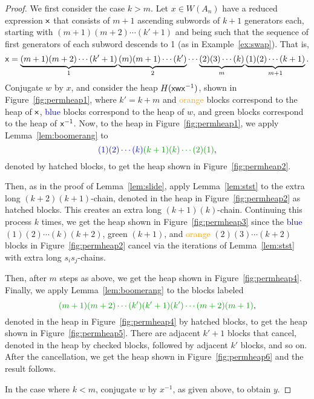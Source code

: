 \begin{proof} We first consider the case $k>m$.
    Let $x \in W(A_n)$ have a reduced expression $\mathsf{x}$ that consists of $m+1$ ascending subwords of $k+1$ generators each, starting with $(m+1)(m+2) \cdots (k'+1)$ and being such that the sequence of first generators of each subword descends to 1 (as in Example~\ref{ex:swap}).
    That is, $$\mathsf{x} = \underbrace{(m+1)(m+2) \cdots (k'+1)}_{1} \underbrace{(m)(m+1) \cdots (k')}_{2} \cdots \underbrace{(2)(3) \cdots (k)}_{m} \underbrace{(1)(2) \cdots (k+1)}_{m+1}.$$
    Conjugate $w$ by $x$, and consider the heap $H({\mathsf{x}}{\mathsf{w}}{\mathsf{x}^{-1}})$, shown in Figure~\ref{fig:permheap1}, where $k'=k+m$ and \textcolor{orange}{orange} blocks correspond to the heap of $\mathsf{x}$, \textcolor{blue}{blue} blocks correspond to the heap of $w$, and \textcolor{ggreen}{green} blocks correspond to the heap of $\mathsf{x}^{-1}$.
    Now, to the heap in Figure~\ref{fig:permheap1}, we apply Lemma~\ref{lem:boomerang} to $$\textcolor{blue}{(1)(2) \cdots (k)} \textcolor{ggreen}{(k+1)(k) \cdots (2)(1)},$$ denoted by hatched blocks, to get the heap shown in Figure~\ref{fig:permheap2}.
    
    Then, as in the proof of Lemma~\ref{lem:slide}, apply Lemma~\ref{lem:stst} to the extra long $(k+2)(k+1)$-chain, denoted in the heap in Figure~\ref{fig:permheap2} as hatched blocks.
    This creates an extra long $(k+1)(k)$-chain.
    Continuing this process $k$ times, we get the heap shown in Figure~\ref{fig:permheap3} since the \textcolor{blue}{blue} $(1)(2)\cdots(k)(k+2)$, \textcolor{ggreen}{green} $(k+1)$, and \textcolor{orange}{orange} $(2)(3) \cdots (k+2)$ blocks in Figure~\ref{fig:permheap2} cancel via the iterations of Lemma~\ref{lem:stst} with extra long $s_is_j$-chains.
    
    Then, after $m$ steps as above, we get the heap shown in Figure~\ref{fig:permheap4}.
    Finally, we apply Lemma~\ref{lem:boomerang} to the blocks labeled $$\textcolor{ggreen}{(m+1)(m+2) \cdots (k')(k'+1)(k') \cdots (m+2)(m+1)},$$ denoted in the heap in Figure~\ref{fig:permheap4} by hatched blocks, to get the heap shown in Figure~\ref{fig:permheap5}.
    There are adjacent $k'+1$ blocks that cancel, denoted in the heap by checked blocks, followed by adjacent $k'$ blocks, and so on. After the cancellation, we get the heap shown in Figure~\ref{fig:permheap6} and the result follows.
    
    In the case where $k<m$, conjugate $w$ by $x^{-1}$, as given above, to obtain $y$.
\end{proof}

